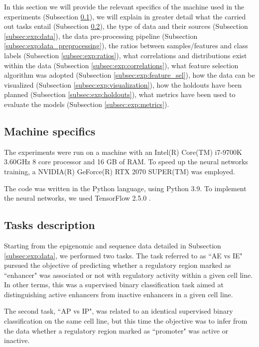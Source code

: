 \documentclass{article}
\begin{document}
In this section we will provide the relevant specifics of the machine used in the experiments (Subsection \ref{subsec:exp:machine}), we will explain in greater detail what the carried out tasks entail (Subsection \ref{subsec:exp:task}), the type of data and their sources (Subsection \ref{subsec:exp:data}), the data pre-processing pipeline (Subsection \ref{subsec:exp:data_preprocessing}), the ratios between samples/features and class labels (Subsection \ref{subsec:exp:ratios}), what correlations and distributions exist within the data (Subsection \ref{subsec:exp:correlations}), what feature selection algorithm was adopted (Subsection \ref{subsec:exp:feature_sel}), how the data can be visualized (Subsection \ref{subsec:exp:visualization}), how the holdouts have been planned (Subsection \ref{subsec:exp:holdouts}), what metrics have been used to evaluate the models (Subsection \ref{subsec:exp:metrics}).


\subsection{Machine specifics}
\label{subsec:exp:machine}

The experiments were run on a machine with an Intel(R) Core(TM) i7-9700K 3.60GHz 8 core processor and 16 GB of RAM. To speed up the neural networks training, a NVIDIA(R) GeForce(R) RTX 2070 SUPER(TM) was employed.

The code was written in the Python language, using Python 3.9. To implement the neural networks, we used TensorFlow 2.5.0 \cite{tensorflow2015-whitepaper}.

\subsection{Tasks description}
\label{subsec:exp:task}

Starting from the epigenomic and sequence data detailed in Subsection \ref{subsec:exp:data}, we performed two tasks. The task referred to as  “AE vs IE" pursued the objective of predicting whether a regulatory region marked as  “enhancer" was associated or not with regulatory activity within a given cell line. In other terms, this was a supervised binary classification task aimed at distinguishing active enhancers from inactive enhancers in a given cell line.

The second task,  “AP vs IP", was related to an identical supervised binary classification on the same cell line, but this time the objective was to infer from the data whether a regulatory region marked as  “promoter" was active or inactive.
\end{document}
